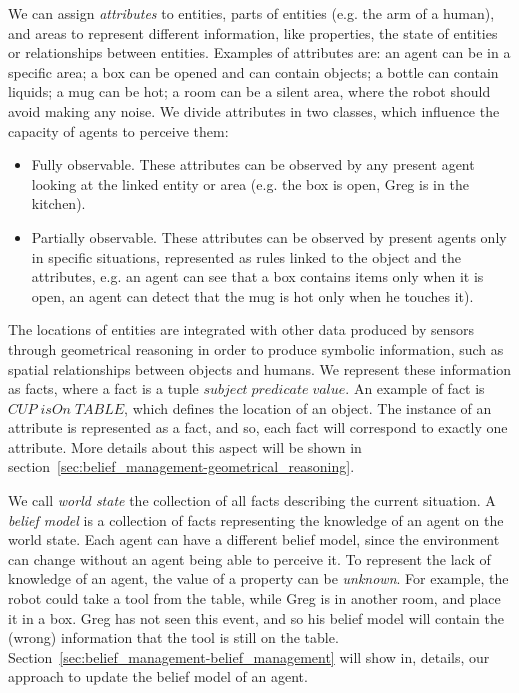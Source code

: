 We can assign \textit{attributes} to entities, parts of entities (e.g. the arm of a human), and areas to represent different information, like properties, the state of entities or relationships between entities. Examples of attributes are:
an agent can be in a specific area; a box can be opened and can contain objects; a bottle can contain liquids; a mug can be hot; a room can be a silent area, where the robot should avoid making any noise.
We divide attributes in two classes, which influence the capacity of agents to perceive them: 
\begin{itemize}
\item Fully observable. These attributes can be observed by any present agent looking at the linked entity or area (e.g. the box is open, Greg is in the kitchen).
\item Partially observable. These attributes can be observed by present agents only in specific situations, represented as rules linked to the object and the attributes, e.g. an agent can see that a box contains items only when it is open, an agent can detect that the mug is hot only when he touches it). 
\end{itemize}

The locations of entities are integrated with other data produced by sensors through geometrical reasoning in order to produce symbolic information, such as spatial relationships between objects and humans. We represent these information as facts, where a fact is a tuple $subject\; predicate\; value$. An example of fact is $CUP\; isOn\; TABLE$, which defines the location of an object. The instance of an attribute is represented as a fact, and so, each fact will correspond to exactly one attribute. More details about this aspect will be shown in section~\ref{sec:belief_management-geometrical_reasoning}.

We call \textit{world state} the collection of all facts describing the current situation. A \textit{belief model} is a collection of facts representing the knowledge of an agent on the world state. Each agent can have a different belief model, since the environment can change without an agent being able to perceive it. To represent the lack of knowledge of an agent, the value of a property can be \textit{unknown}. For example, the robot could take a tool from the table, while Greg is in another room, and place it in a box. Greg has not seen this event, and so his belief model will contain the (wrong) information that the tool is still on the table.  Section~\ref{sec:belief_management-belief_management} will show in, details, our approach to update the belief model of an agent.

